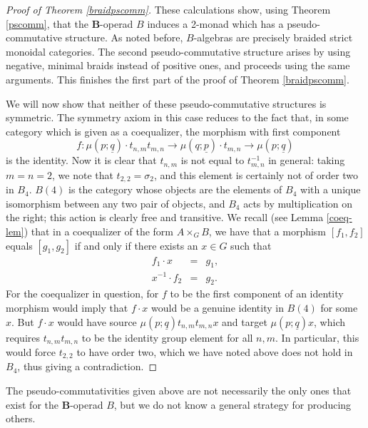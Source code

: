 \documentclass{amsbook} %
\newcommand{\mb}{\mathbf}
\numberwithin{section}{chapter}
\begin{document}
\begin{proof}[Proof of Theorem \ref{braidpscomm}]
These calculations show, using Theorem \ref{pscomm}, that the $\mb{B}$-operad $B$ induces a 2-monad which has a pseudo-commutative structure.  As noted before, $B$-algebras are precisely braided strict monoidal categories.  The second pseudo-commutative structure arises by using negative, minimal braids instead of positive ones, and proceeds using the same arguments.  This finishes the first part of the proof of Theorem \ref{braidpscomm}.

We will now show that neither of these pseudo-commutative structures is symmetric.  The symmetry axiom in this case reduces to the fact that, in some category which is given as a coequalizer, the morphism with first component
\[
f\colon \mu(p; \underline{q}) \cdot t_{n,m}t_{m,n} \rightarrow \mu(q; \underline{p}) \cdot t_{m,n} \rightarrow \mu(p; \underline{q})
\]
is the identity.  Now it is clear that $t_{n,m}$ is not equal to $t_{m,n}^{-1}$ in general: taking $m=n=2$, we note that $t_{2,2} = \sigma_{2}$, and this element is certainly not of order two in $B_{4}$.  $B(4)$ is the category whose objects are the elements of $B_{4}$ with a unique isomorphism between any two pair of objects, and $B_{4}$ acts by multiplication on the right; this action is clearly free and transitive.  We recall (see Lemma \ref{coeq-lem}) that in a coequalizer of the form $A \times_{G} B$, we have that a morphism $[f_{1}, f_{2}]$ equals $[g_{1}, g_{2}]$ if and only if there exists an $x \in G$ such that
\[
\begin{array}{rcl}
f_{1} \cdot x & = & g_{1}, \\
x^{-1} \cdot f_{2} & = & g_{2}.
\end{array}
\]
For the coequalizer in question, for $f$ to be the first component of an identity morphism would imply that $f \cdot x$ would be a genuine identity in $B(4)$ for some $x$.  But $f \cdot x$ would have source $\mu(p; \underline{q}) t_{n,m}t_{m,n}x$ and target $\mu(p; \underline{q})x$, which requires $t_{n,m}t_{m,n}$ to be the identity group element for all $n,m$.  In particular, this would force $t_{2,2}$ to have order two, which we have noted above does not hold in $B_{4}$, thus giving a contradiction.
\end{proof}

\begin{rem}
The pseudo-commutativities given above are not necessarily the only ones that exist for the $\mb{B}$-operad $B$, but we do not know a general strategy for producing others.
\end{rem}
\end{document}
